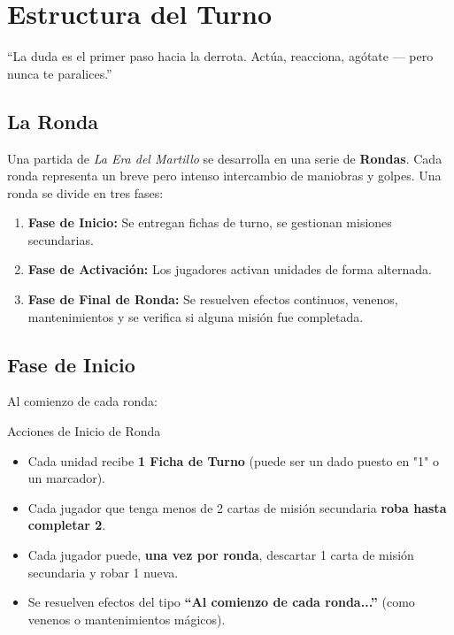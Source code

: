 
\chapter{Estructura del Turno}

\begin{loreblock}
``La duda es el primer paso hacia la derrota. Actúa, reacciona, agótate — pero nunca te paralices.''
\end{loreblock}

\vspace{0.4cm}

\section{La Ronda}

Una partida de \textit{La Era del Martillo} se desarrolla en una serie de \textbf{Rondas}. Cada ronda representa un breve pero intenso intercambio de maniobras y golpes. Una ronda se divide en tres fases:

\begin{enumerate}
    \item \textbf{Fase de Inicio:} Se entregan fichas de turno, se gestionan misiones secundarias.
    \item \textbf{Fase de Activación:} Los jugadores activan unidades de forma alternada.
    \item \textbf{Fase de Final de Ronda:} Se resuelven efectos continuos, venenos, mantenimientos y se verifica si alguna misión fue completada.
\end{enumerate}

\section{Fase de Inicio}

Al comienzo de cada ronda:

\begin{reglaespecial}{Acciones de Inicio de Ronda}
\begin{itemize}
    \item Cada unidad recibe \textbf{1 Ficha de Turno} (puede ser un dado puesto en "1" o un marcador).
    \item Cada jugador que tenga menos de 2 cartas de misión secundaria \textbf{roba hasta completar 2}.
    \item Cada jugador puede, \textbf{una vez por ronda}, descartar 1 carta de misión secundaria y robar 1 nueva.
    \item Se resuelven efectos del tipo \textbf{``Al comienzo de cada ronda...''} (como venenos o mantenimientos mágicos).
\end{itemize}
\end{reglaespecial}

